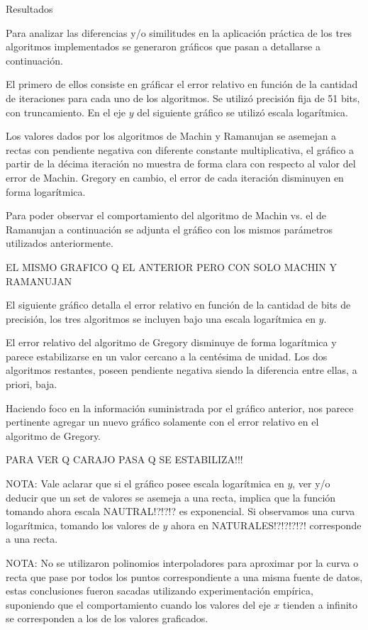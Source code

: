 \begin{section}{Resultados}

	Para analizar las diferencias y/o similitudes en la aplicación práctica de los tres algoritmos implementados se generaron gráficos que pasan a detallarse a continuación. 
		
	El primero de ellos consiste en gráficar el error relativo en función de la cantidad de iteraciones para cada uno de los algoritmos. Se utilizó precisión fija de 51 bits, con truncamiento. En el eje $y$ del siguiente gráfico se utilizó escala logarítmica.


	Los valores dados por los algoritmos de Machin y Ramanujan se asemejan a rectas con pendiente negativa con diferente constante multiplicativa, el gráfico a partir de la décima iteración no muestra de forma clara con respecto al valor del error de Machin. Gregory en cambio, el error de cada iteración disminuyen en forma logarítmica.
	
	Para poder observar el comportamiento del algoritmo de Machin vs. el de Ramanujan a continuación se adjunta el gráfico con los mismos parámetros utilizados anteriormente.

	EL MISMO GRAFICO Q EL ANTERIOR PERO CON SOLO MACHIN Y RAMANUJAN

	El siguiente gráfico detalla el error relativo en función de la cantidad de bits de precisión, los tres algoritmos se incluyen bajo una escala logarítmica en $y$. 


	El error relativo del algoritmo de Gregory disminuye de forma logarítmica y parece estabilizarse en un valor cercano a la centésima de unidad. Los dos algoritmos restantes, poseen pendiente negativa siendo la diferencia entre ellas, a priori, baja.
	
	Haciendo foco en la información suministrada por el gráfico anterior, nos parece pertinente agregar un nuevo gráfico solamente con el error relativo en el algoritmo de Gregory.
	
	PARA VER Q CARAJO PASA Q SE ESTABILIZA!!!

	NOTA: Vale aclarar que si el gráfico posee escala logarítmica en $y$, ver y/o deducir que un set de valores se asemeja a una recta, implica que la función tomando ahora escala NAUTRAL!?!?!? es exponencial. Si observamos una curva logarítmica, tomando los valores de $y$ ahora en NATURALES!?!?!?!?! corresponde a una recta.
	
	NOTA: No se utilizaron polinomios interpoladores para aproximar por la curva o recta que pase por todos los puntos correspondiente a una misma fuente de datos, estas conclusiones fueron sacadas utilizando experimentación empírica, suponiendo que el comportamiento cuando los valores del eje $x$ tienden a infinito se corresponden a los de los valores graficados.

\end{section}
